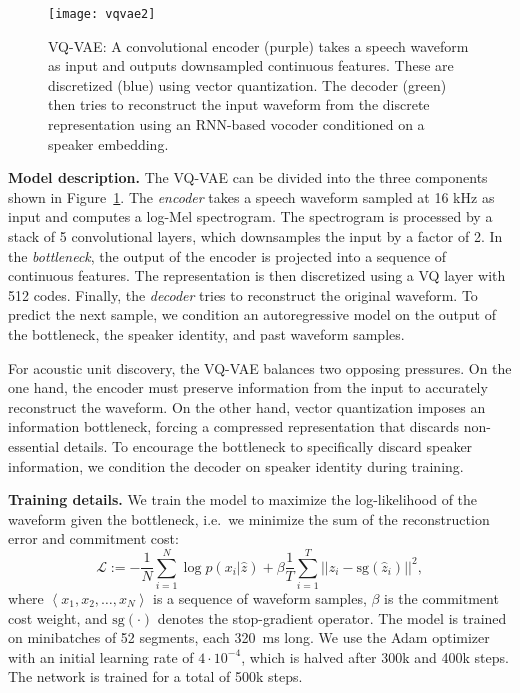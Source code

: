 \documentclass[a4paper]{article}
\newcommand{\imagesep}{\vspace*{-4pt}}
\begin{document}
\begin{figure}[!b]
    \centering
    \texttt{[image: vqvae2]}
        \imagesep
    \caption{
    VQ-VAE:
    A convolutional encoder (purple) takes a speech waveform as input and outputs downsampled continuous features.
    These are discretized (blue) using vector quantization.
    The decoder (green) then tries to reconstruct the input waveform from the discrete representation using an RNN-based vocoder conditioned on a speaker embedding.
}
    \label{fig:vqwav}
\end{figure}

\label{sec:vqvae_model}

\textbf{Model description.}
The VQ-VAE can be divided into the three components shown in Figure~\ref{fig:vqwav}.
The \textit{encoder} takes a speech waveform sampled at 16 kHz as input and computes a log-Mel spectrogram.
The spectrogram is processed by a stack of 5 convolutional layers, which downsamples the input by a factor of 2.
In the \textit{bottleneck}, the output of the encoder is projected into a sequence of continuous features. 
 The representation is then discretized using a VQ layer with 512 codes.
Finally, the \textit{decoder} tries to reconstruct the original waveform. 
To predict the next sample, we condition an autoregressive model on the output of the bottleneck, the speaker identity, and past waveform samples.

For acoustic unit discovery, the VQ-VAE balances two opposing pressures. 
On the one hand, the encoder must preserve information from the input  to accurately reconstruct the waveform.
On the other hand, vector quantization imposes an information bottleneck, forcing a compressed representation that discards non-essential details.
To encourage the bottleneck to specifically discard speaker information, we condition the decoder on speaker identity during training.


\textbf{Training details.}
We train the model to maximize the log-likelihood of the waveform given the bottleneck, i.e.\ we minimize the sum of the reconstruction error and commitment cost:
\begin{equation*}
\mathcal{L} := - \frac{1}{N} \sum_{i=1}^N \log p(x_i| \hat{z}) + \beta { \frac{1}{T} \sum_{i=1}^T ||z_i - \text{sg}(\hat{z}_i)||^2},
\end{equation*}
where $\left\langle x_1, x_2, \ldots, x_N  \right\rangle$ is a sequence of waveform samples, $\beta$ is the commitment cost weight, and $\text{sg}(\cdot)$  denotes the stop-gradient operator.
The model is trained on minibatches of 52 segments, each 320~ms long.
We use the Adam optimizer \cite{kingma+ba_iclr15} with an initial learning rate of $4 \cdot 10^{-4}$, which is halved after 300k and 400k steps.
The network is trained for a total of 500k steps.
\end{document}
